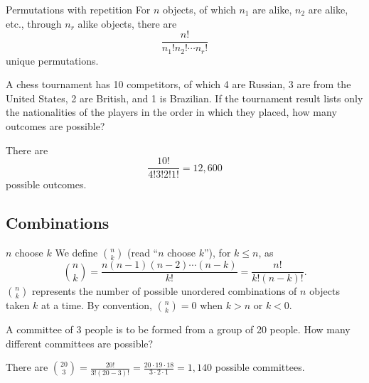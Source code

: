 \begin{bdef}{Permutations with repetition}\label{permutationsrepetition}
    For $n$ objects, of which $n_1$ are alike, $n_2$ are alike, etc., through $n_r$ alike objects, there are \[
        \frac{n!}{n_1!n_2!\cdots n_r!}    
    \] unique permutations.
\end{bdef}

\begin{changebar}
    \begin{example}
        A chess tournament has 10 competitors, of which 4 are Russian, 3 are from the United States, 2 are British, and 1 is Brazilian. If the tournament result lists only the nationalities of the players in the order in which they placed, how many outcomes are possible?    
    \end{example}
    \begin{solution}
        There are \[
            \frac{10!}{4!3!2!1!} = 12{,}600
            \] possible outcomes.
        \end{solution}
    \end{changebar}

\subsection{Combinations}
\begin{bdef}{$n$ choose $k$}
    We define ${n \choose k}$ (read ``$n$ choose $k$''), for $k \leq n$, as \[
        {n \choose k} = \frac{n(n-1)(n-2)\cdots(n-k)}{k!} = \frac{n!}{k!(n-k)!}.
    \] ${n \choose k}$ represents the number of possible unordered combinations of $n$ objects taken $k$ at a time. By convention, ${n \choose k} = 0$ when $k > n$ or $k < 0$.
\end{bdef}

\begin{changebar}
    \begin{example}
        A committee of 3 people is to be formed from a group of 20 people. How many different committees are possible?
    \end{example}
    \begin{solution}
        There are $\displaystyle {20 \choose 3} = \frac{20!}{3!(20-3)!} = \frac{20\cdot 19 \cdot 18}{3 \cdot 2 \cdot 1} = 1{,}140$ possible committees.
    \end{solution}
\end{changebar}


